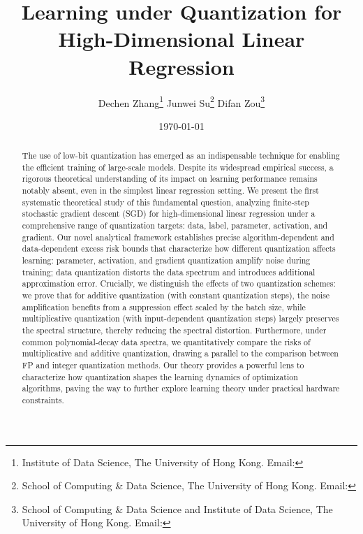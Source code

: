 \documentclass[11pt, letterpaper]{article}
\title{\LARGE Learning under Quantization for High-Dimensional Linear Regression}
\author{
Dechen Zhang\thanks{Institute of Data Science, The University of Hong Kong. Email: \email{dechenzhang}{connect.hku.hk}}
\qquad Junwei Su\thanks{School of Computing \& Data Science, The University of Hong Kong. Email: \email{junweisu}{connect.hku.hk}}
\qquad Difan Zou\thanks{School of Computing \& Data Science and Institute of Data Science, The University of Hong Kong. Email: \email{dzou}{hku.hk} }
}
\date{\small{\today}}
\begin{document}

\maketitle

\begin{abstract}
    The use of low-bit quantization has emerged as an indispensable technique for enabling the efficient training of large-scale models. Despite its widespread empirical success, a rigorous theoretical understanding of its impact on learning performance remains notably absent, even in the simplest linear regression setting. We present the first systematic theoretical study of this fundamental question, analyzing finite-step stochastic gradient descent (SGD) for high-dimensional linear regression under a comprehensive range of quantization targets: data, label, parameter, activation, and gradient. 
    Our novel analytical framework establishes precise algorithm-dependent and data-dependent excess risk bounds that characterize how different quantization affects learning: parameter, activation, and gradient quantization amplify noise during training; data quantization distorts the data spectrum and introduces additional approximation error. Crucially, we distinguish the effects of two quantization schemes: we prove that for additive quantization (with constant quantization steps), the noise amplification benefits from a suppression effect scaled by the batch size, while multiplicative quantization (with input-dependent quantization steps) largely preserves the spectral structure, thereby reducing the spectral distortion.
    Furthermore, under common polynomial-decay data spectra, we quantitatively compare the risks of multiplicative and additive quantization, drawing a parallel to the comparison between FP and integer quantization methods. Our theory provides a powerful lens to characterize how quantization shapes the learning dynamics of optimization algorithms, paving the way to further explore learning theory under practical hardware constraints.
\end{abstract}




\end{document}
